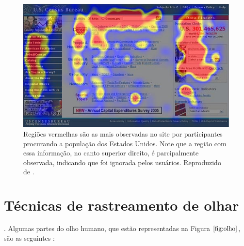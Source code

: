 \begin{figure}
\begin{center}
\includegraphics[scale=.7]{imagens/census-homepage-heatmap.jpg}
\caption{Regiões vermelhas são as mais observadas no site por participantes procurando a população dos Estados Unidos. Note que a região com essa informação, no canto superior direito, é parcipalmente observada, indicando que foi ignorada pelos usuários. Reproduzido de \cite{nielsen2007fancy}.}
\label{fig:censo}
\end{center}
\end{figure}

\section{Técnicas de rastreamento de olhar}

. Algumas partes do olho humano, que estão representadas na Figura $\ref{fig:olho}$,  são as seguintes \cite{lidade}:


